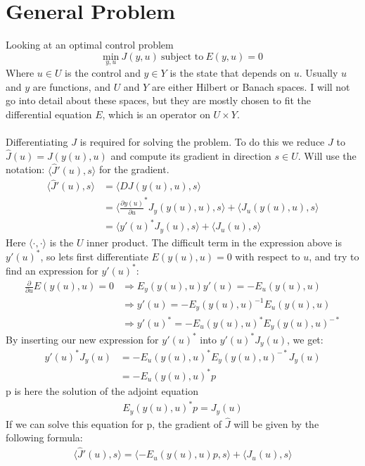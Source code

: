 \documentclass[11pt,a4paper]{article}
\begin{document}
\section{General Problem}
Looking at an optimal control problem $$\underset{y,u}{\text{min}} \ J(y,u) \ \text{subject to} \ E(y,u)=0$$ Where $u \in U$ is the control and $y \in Y$ is the state that depends on $u$. Usually $u$ and $y$ are functions, and $U$ and $Y$ are either Hilbert or Banach spaces. I will not go into detail about these spaces, but they are mostly chosen to fit the differential equation $E$, which is an operator on $U\times Y$.
\\
\\
Differentiating $J$ is required for solving the problem. To do this we reduce $J$ to $\hat{J}(u) = J(y(u),u) $ and compute its gradient in direction $s \in U$. Will use the notation: $\langle\hat{J}'(u),s\rangle$ for the gradient.
\begin{align*}    
\langle\hat{J}'(u),s\rangle &= \langle DJ(y(u),u) ,s\rangle \\ &= \langle \frac{\partial y(u)}{\partial u}^*J_y(y(u),u),s\rangle + \langle J_u(y(u),u),s\rangle \\ &= \langle y'(u)^*J_y(u),s\rangle +\langle J_u(u),s\rangle
\end{align*}
Here $\langle\cdot,\cdot\rangle$ is the $U$ inner product. The difficult term in the expression above is $y'(u)^*$, so lets first differentiate $E(y(u),u)=0$ with respect to $u$, and try to find an expression for $y'(u)^*$: 
\begin{align*}
\frac{\partial}{\partial u}E(y(u),u)=0 &\Rightarrow E_y(y(u),u)y'(u)=-E_u(y(u),u) \\ &\Rightarrow y'(u)=-E_y(y(u),u)^{-1}E_u(y(u),u) \\ &\Rightarrow y'(u)^* = -E_u(y(u),u)^*E_y(y(u),u)^{-*}
\end{align*} 
By inserting our new expression for $y'(u)^*$ into $y'(u)^*J_y(u)$, we get:
\begin{align*}
y'(u)^*J_y(u)&=-E_u(y(u),u)^*E_y(y(u),u)^{-*}J_y(u) \\
&=-E_u(y(u),u)^*p
\end{align*}
p is here the solution of the adjoint equation 
\begin{gather*}
E_y(y(u),u)^{*}p=J_y(u)
\end{gather*}
If we can solve this equation for p, the gradient of $\hat{J}$ will be given by the following formula:  
\begin{gather}
\langle\hat{J}'(u),s\rangle=\langle -E_u(y(u),u)p,s\rangle +\langle J_u(u),s\rangle
\end{gather} 
\\
\\
\end{document}
